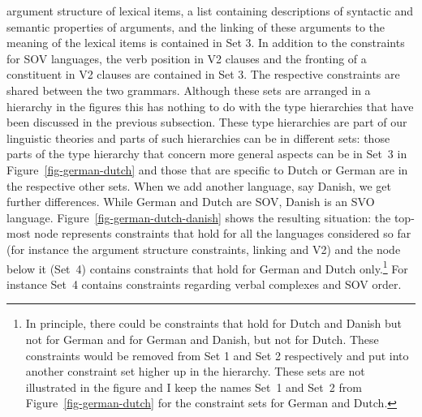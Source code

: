 argument structure of lexical items, a list containing descriptions of syntactic and semantic properties of
arguments, and the linking of these arguments to the meaning of the lexical items is contained in Set 3. In
addition to the constraints for SOV languages, the verb position in V2 clauses and the fronting of a
constituent in V2 clauses are contained in Set 3. The respective constraints are shared between the
two grammars. Although these sets are arranged in a hierarchy in the figures this has nothing to do
with the type hierarchies that have been discussed in the previous subsection. These type
hierarchies are part of our linguistic theories and parts of such hierarchies can be in different
sets: those parts of the type hierarchy that concern more general aspects can be in Set~3 in
Figure~\ref{fig-german-dutch} and those that are specific to Dutch or German are in the respective
other sets. When we add another language, say Danish, we get further differences. While German and Dutch are SOV, Danish
is an SVO language. Figure~\vref{fig-german-dutch-danish} shows the resulting situation: the
top-most node represents constraints that hold for all the languages considered so far (for instance the argument
structure constraints, linking and V2) and the node below it (Set~4) contains
constraints that hold for German and Dutch only.\footnote{
  In principle, there could be constraints that hold for Dutch and Danish but not for German and for
  German and Danish, but not for Dutch. These constraints would be removed from Set 1 and Set 2
  respectively and put into another constraint set higher up in the hierarchy. These sets are not
  illustrated in the figure and I keep the names Set~1 and Set~2 from Figure~\ref{fig-german-dutch} for the constraint sets for German
  and Dutch.
} For instance Set~4 contains constraints regarding verbal complexes and SOV order.
